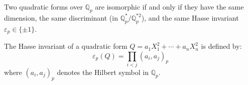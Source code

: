 Two quadratic forms over $\mathbb{Q}_p$ are isomorphic if and only if they have the same dimension, the same discriminant (in $\mathbb{Q}_p^*/\mathbb{Q}_p^{*2}$), and the same Hasse invariant $\varepsilon_p \in \{\pm 1\}$.

The Hasse invariant of a quadratic form $Q = a_1 X_1^2 + \cdots + a_n X_n^2$ is defined by:
$$\varepsilon_p(Q) = \prod_{i < j} (a_i, a_j)_p$$
where $(a_i, a_j)_p$ denotes the Hilbert symbol in $\mathbb{Q}_p$.
